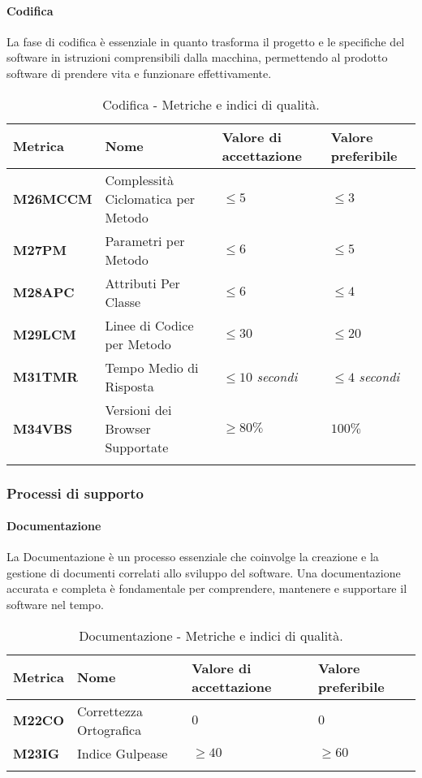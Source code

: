 \paragraph{Codifica}
La fase di codifica è essenziale in quanto trasforma il progetto e le specifiche del software in istruzioni comprensibili dalla macchina, permettendo al prodotto software di prendere vita e funzionare effettivamente.

\hspace{1pt}
    \begin{longtable}{|C{1.8cm}|L{3cm}|L{2.5cm}|L{2.5cm}|}
        \hline
        \textbf{Metrica} & \textbf{Nome} & \textbf{Valore di accettazione} & \textbf{Valore preferibile} \\
        \hline
        \textbf{M26MCCM} & Complessità Ciclomatica per Metodo & $\leq 5$ & $\leq 3$ \\
        \hline
        \textbf{M27PM} & Parametri per Metodo & $\leq 6$ & $\leq 5$ \\
        \hline
        \textbf{M28APC} & Attributi Per Classe & $\leq 6$ & $\leq 4$ \\
        \hline
        \textbf{M29LCM} & Linee di Codice per Metodo & $\leq 30$ & $\leq 20$ \\
        \hline
        \textbf{M31TMR} & Tempo Medio di Risposta & $\leq 10$ \textit{secondi}  & $\leq 4$ \textit{secondi} \\
        \hline
        \textbf{M34VBS} & Versioni dei Browser Supportate & $\geq 80\%$ & $100\%$ \\
        \hline
    \caption{Codifica - Metriche e indici di qualità.}
    \label{tab:metriche}
\end{longtable}




\subsubsection{Processi di supporto}

\paragraph{Documentazione}
La Documentazione è un processo essenziale che coinvolge la creazione e la gestione di documenti correlati allo sviluppo del software. Una documentazione accurata e completa è fondamentale per comprendere, mantenere e supportare il software nel tempo.
\hspace{1pt}
    \begin{longtable}{|C{1.5cm}|L{3cm}|L{2.5cm}|L{2.5cm}|}
        \hline
        \textbf{Metrica} & \textbf{Nome} & \textbf{Valore di accettazione} & \textbf{Valore preferibile} \\
        \hline
        \textbf{M22CO} & Correttezza Ortografica & $0$ & $0$ \\
        \hline
        \textbf{M23IG} & Indice Gulpease & $\geq 40$ & $\geq 60$ \\
        \hline
    \caption{Documentazione - Metriche e indici di qualità.}
    \label{tab:metriche_testo}
\end{longtable}

